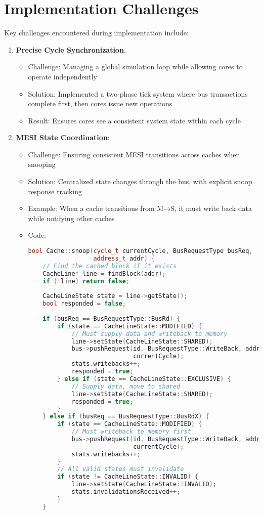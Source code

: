 \documentclass[11pt]{article}
\begin{document}
\section{Implementation Challenges}

Key challenges encountered during implementation include:

\begin{enumerate}
    \item \textbf{Precise Cycle Synchronization}: 
    \begin{itemize}
        \item Challenge: Managing a global simulation loop while allowing cores to operate independently
        \item Solution: Implemented a two-phase tick system where bus transactions complete first, then cores issue new operations
        \item Result: Ensures cores see a consistent system state within each cycle
    \end{itemize}
    
    \item \textbf{MESI State Coordination}: 
    \begin{itemize}
        \item Challenge: Ensuring consistent MESI transitions across caches when snooping
        \item Solution: Centralized state changes through the bus, with explicit snoop response tracking
        \item Example: When a cache transitions from M→S, it must write back data while notifying other caches
        \item Code:
        \begin{lstlisting}[language=C++]
bool Cache::snoop(cycle_t currentCycle, BusRequestType busReq, 
                  address_t addr) {
    // Find the cached block if it exists
    CacheLine* line = findBlock(addr);
    if (!line) return false;
    
    CacheLineState state = line->getState();
    bool responded = false;
    
    if (busReq == BusRequestType::BusRd) {
        if (state == CacheLineState::MODIFIED) {
            // Must supply data and writeback to memory
            line->setState(CacheLineState::SHARED);
            bus->pushRequest(id, BusRequestType::WriteBack, addr, 
                             currentCycle);
            stats.writebacks++;
            responded = true;
        } else if (state == CacheLineState::EXCLUSIVE) {
            // Supply data, move to shared
            line->setState(CacheLineState::SHARED);
            responded = true;
        }
    } else if (busReq == BusRequestType::BusRdX) {
        if (state == CacheLineState::MODIFIED) {
            // Must writeback to memory first
            bus->pushRequest(id, BusRequestType::WriteBack, addr, 
                             currentCycle);
            stats.writebacks++;
        }
        // All valid states must invalidate
        if (state != CacheLineState::INVALID) {
            line->setState(CacheLineState::INVALID);
            stats.invalidationsReceived++;
        }
    }
    

\end{lstlisting}
\end{itemize}
\end{enumerate}
\end{document}
